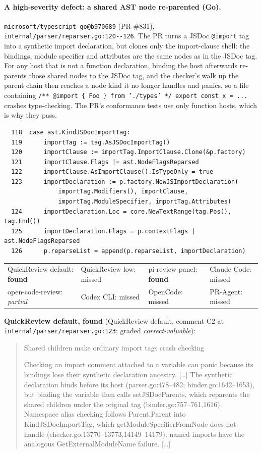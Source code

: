 \documentclass[11pt,a4paper]{article}
\newcommand{\code}[1]{\texttt{#1}}
\begin{document}
\paragraph{A high-severity defect: a shared AST node re-parented
(Go).} \code{microsoft/\allowbreak{}typescript-go@b970689} (PR \#831),
\code{internal/parser/reparser.go:120-{}-126}. The PR turns a JSDoc
\code{@import} tag into a synthetic import declaration, but clones only the
import-clause shell: the bindings, module specifier and attributes are the
same nodes as in the JSDoc tag. For any host that is not a function
declaration, binding the host afterwards re-parents those shared nodes to
the JSDoc tag, and the checker's walk up the parent chain then reaches a
node kind it no longer handles and panics, so a file containing
\code{/** @import \{ Foo \} from './types' */ export const x = ...} crashes
type-checking. The PR's conformance tests use only function hosts, which
is why they pass.
{\footnotesize
\begin{verbatim}
  118  case ast.KindJSDocImportTag:
  119      importTag := tag.AsJSDocImportTag()
  120      importClause := importTag.ImportClause.Clone(&p.factory)
  121      importClause.Flags |= ast.NodeFlagsReparsed
  122      importClause.AsImportClause().IsTypeOnly = true
  123      importDeclaration := p.factory.NewJSImportDeclaration(
               importTag.Modifiers(), importClause,
               importTag.ModuleSpecifier, importTag.Attributes)
  124      importDeclaration.Loc = core.NewTextRange(tag.Pos(), tag.End())
  125      importDeclaration.Flags = p.contextFlags | ast.NodeFlagsReparsed
  126      p.reparseList = append(p.reparseList, importDeclaration)
\end{verbatim}
}
\begin{center}\footnotesize
\begin{tabular}{@{}llll@{}}
\hline
QuickReview default: \textbf{found} & QuickReview low: missed & pi-review panel: \textbf{found} & Claude Code: missed \\
open-code-review: \emph{partial} & Codex CLI: missed & OpenCode: missed & PR-Agent: missed \\
\hline
\end{tabular}
\end{center}
\noindent\textbf{QuickReview default, found} (QuickReview default, comment C2 at \code{internal/\allowbreak{}parser/\allowbreak{}reparser.go:123}; graded \emph{correct-valuable}):
\begin{quote}\small
Shared children make ordinary import tags crash checking\par Checking an import comment attached to a variable can panic because its bindings lose their synthetic declaration ancestry. [\ldots] The synthetic declaration binds before its host (parser.go:478--482; binder.go:1642--1653), but binding the variable then calls setJSDocParents, which reparents the shared children under the original tag (binder.go:757--761,1616). Namespace alias checking follows Parent.Parent into KindJSDocImportTag, which getModuleSpecifierFromNode does not handle (checker.go:13770--13773,14149--14179); named imports have the analogous GetExternalModuleName failure. [\ldots]
\end{quote}
\end{document}
